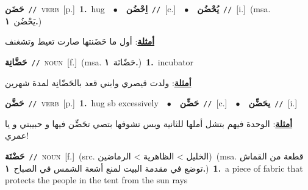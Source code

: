 \documentclass[10pt,a4paper,twoside]{article} %
\begin{document}
\begin{multicols}{2}
{\setlength\topsep{0pt}\textbf{\foreignlanguage{arabic}{حَضَن}}\ {\color{gray}\texttt{//}\color{black}}\ \textsc{verb}\ [p.]\ \textbf{1.}~hug\ \ $\bullet$\ \ \setlength\topsep{0pt}\textbf{\foreignlanguage{arabic}{اِحْضُن}}\ {\color{gray}\texttt{//}\color{black}}\ [c.]\ \ $\bullet$\ \ \setlength\topsep{0pt}\textbf{\foreignlanguage{arabic}{يُحْضُن}}\ {\color{gray}\texttt{//}\color{black}}\ [i.]\ \color{gray}(msa. \foreignlanguage{arabic}{يَحْضُن}~\foreignlanguage{arabic}{\textbf{١.}})\color{black}\  \begin{flushright}\color{gray}\foreignlanguage{arabic}{\textbf{\underline{\foreignlanguage{arabic}{أمثلة}}}: أول ما حَضَنتها صارت تعيط وتشغنف}\end{flushright}\color{black}} \vspace{2mm}

{\setlength\topsep{0pt}\textbf{\foreignlanguage{arabic}{حَضَّانِة}}\ {\color{gray}\texttt{//}\color{black}}\ \textsc{noun}\ [f.]\ \color{gray}(msa. \foreignlanguage{arabic}{حَضّانَة}~\foreignlanguage{arabic}{\textbf{١.}})\color{black}\ \textbf{1.}~incubator\  \begin{flushright}\color{gray}\foreignlanguage{arabic}{\textbf{\underline{\foreignlanguage{arabic}{أمثلة}}}: ولدت قيصري وابني قعد بالحَضّانِة لمدة شهرين}\end{flushright}\color{black}} \vspace{2mm}

{\setlength\topsep{0pt}\textbf{\foreignlanguage{arabic}{حَضَّن}}\ {\color{gray}\texttt{//}\color{black}}\ \textsc{verb}\ [p.]\ \textbf{1.}~hug sb excessively\ \ $\bullet$\ \ \setlength\topsep{0pt}\textbf{\foreignlanguage{arabic}{حَضِّن}}\ {\color{gray}\texttt{//}\color{black}}\ [c.]\ \ $\bullet$\ \ \setlength\topsep{0pt}\textbf{\foreignlanguage{arabic}{يحَضِّن}}\ {\color{gray}\texttt{//}\color{black}}\ [i.]\  \begin{flushright}\color{gray}\foreignlanguage{arabic}{\textbf{\underline{\foreignlanguage{arabic}{أمثلة}}}: الوحدة فيهم بتشل أملها للثانية وبس تشوفها بتصي تحَضِّن فيها و حبيبتي و يا عمري!}\end{flushright}\color{black}} \vspace{2mm}

{\setlength\topsep{0pt}\textbf{\foreignlanguage{arabic}{حَضْنَة}}\ {\color{gray}\texttt{//}\color{black}}\ \textsc{noun}\ [f.]\ (src. \color{gray}\foreignlanguage{arabic}{الخليل > الظاهرية > الرماضين}\color{black})\ \color{gray}(msa. \foreignlanguage{arabic}{قطعة من القماش توضع في مقدمة البيت لمنع أشعة الشمس في الصباح}~\foreignlanguage{arabic}{\textbf{١.}})\color{black}\ \textbf{1.}~a piece of fabric that protects the people in the tent from the sun rays\ } \vspace{2mm}


\end{multicols}
\end{document}
